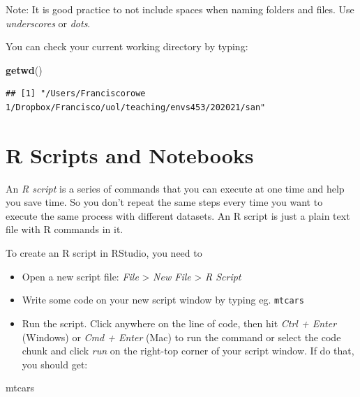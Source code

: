 \documentclass[
]{book}
\newenvironment{Shaded}{\begin{snugshade}}{\end{snugshade}}
\newcommand{\KeywordTok}[1]{\textcolor[rgb]{0.13,0.29,0.53}{\textbf{#1}}}
\newcommand{\NormalTok}[1]{#1}
\begin{document}
Note: It is good practice to not include spaces when naming folders and files. Use \emph{underscores} or \emph{dots}.

You can check your current working directory by typing:

\begin{Shaded}
\begin{Highlighting}[]
\KeywordTok{getwd}\NormalTok{()}
\end{Highlighting}
\end{Shaded}

\begin{verbatim}
## [1] "/Users/Franciscorowe 1/Dropbox/Francisco/uol/teaching/envs453/202021/san"
\end{verbatim}

\hypertarget{r-scripts-and-notebooks}{%
\section{R Scripts and Notebooks}\label{r-scripts-and-notebooks}}

An \emph{R script} is a series of commands that you can execute at one time and help you save time. So you don't repeat the same steps every time you want to execute the same process with different datasets. An R script is just a plain text file with R commands in it.

To create an R script in RStudio, you need to

\begin{itemize}
\item
  Open a new script file: \emph{File} \textgreater{} \emph{New File} \textgreater{} \emph{R Script}
\item
  Write some code on your new script window by typing eg. \texttt{mtcars}
\item
  Run the script. Click anywhere on the line of code, then hit \emph{Ctrl + Enter} (Windows) or \emph{Cmd + Enter} (Mac) to run the command or select the code chunk and click \emph{run} on the right-top corner of your script window. If do that, you should get:
\end{itemize}

\begin{Shaded}
\begin{Highlighting}[]
\NormalTok{mtcars}
\end{Highlighting}
\end{Shaded}
\end{document}
